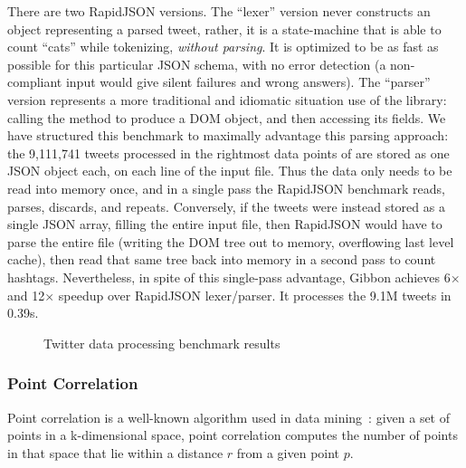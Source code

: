There are two RapidJSON versions. The ``lexer'' version never constructs an
object representing a parsed tweet, rather, it is a state-machine
that is able to count ``cats'' while tokenizing, {\em without parsing}.  It is
optimized to be as fast as possible for this particular JSON schema, with no
error detection (a non-compliant input would give silent failures and wrong
answers).
%
The ``parser'' version represents a more traditional and idiomatic situation use
of the library: calling the  method to produce a DOM object, and
then accessing its fields.
%
We have structured this benchmark to maximally advantage this parsing approach:
the 9,111,741 tweets processed in the rightmost data points of  are stored as one JSON object each, on each line of the input file.
%
Thus the data only needs to be read into memory once, and in a single pass the RapidJSON benchmark reads, parses, discards, and repeats.
%
Conversely, if the tweets were instead stored as a single JSON array, filling
the entire input file, then RapidJSON would have to parse the entire file
(writing the DOM tree out to memory, overflowing last level cache), then read
that same tree back into memory in a second pass to count hashtags.
%
Nevertheless, in spite of this single-pass advantage, Gibbon achieves
6$\times$ and 12$\times$ speedup over RapidJSON lexer/parser.
%
It processes the 9.1M tweets in 0.39s.


\begin{figure}
  \centering
  
  \caption{Twitter data processing benchmark results}
  \label{fig:twitter_slowdown_plot}
\end{figure}

\subsubsection{Point Correlation}

Point correlation  is a well-known algorithm used in data mining~\cite{gray2000n}:
given a set of points in a k-dimensional space, point correlation computes the number of points in that space  that lie within a
distance $r$ from a given point $p$.


